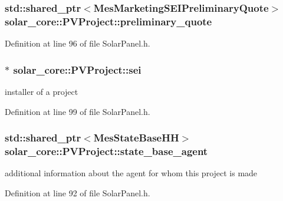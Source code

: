 \subsubsection[{preliminary\+\_\+quote}]{\setlength{\rightskip}{0pt plus 5cm}std\+::shared\+\_\+ptr$<${\bf Mes\+Marketing\+S\+E\+I\+Preliminary\+Quote}$>$ solar\+\_\+core\+::\+P\+V\+Project\+::preliminary\+\_\+quote}\label{classsolar__core_1_1_p_v_project_a5d75e9dfe664f7307b0dc24c1f00d8a9}


Definition at line 96 of file Solar\+Panel.\+h.

\hypertarget{classsolar__core_1_1_p_v_project_af8fdd82137a3b0aa277ae6b9663fcb33}{}
\subsubsection[{sei}]{$\ast$ solar\+\_\+core\+::\+P\+V\+Project\+::sei}\label{classsolar__core_1_1_p_v_project_af8fdd82137a3b0aa277ae6b9663fcb33}
installer of a project 

Definition at line 99 of file Solar\+Panel.\+h.

\hypertarget{classsolar__core_1_1_p_v_project_a1a3576ddac7b82f9a2d7c139af9850d2}{}
\subsubsection[{state\+\_\+base\+\_\+agent}]{\setlength{\rightskip}{0pt plus 5cm}std\+::shared\+\_\+ptr$<${\bf Mes\+State\+Base\+H\+H}$>$ solar\+\_\+core\+::\+P\+V\+Project\+::state\+\_\+base\+\_\+agent}\label{classsolar__core_1_1_p_v_project_a1a3576ddac7b82f9a2d7c139af9850d2}
additional information about the agent for whom this project is made 

Definition at line 92 of file Solar\+Panel.\+h.

\hypertarget{classsolar__core_1_1_p_v_project_ab25a22c1202f2314a55dc9a759922183}{}
